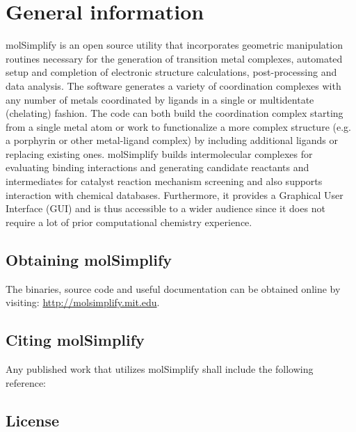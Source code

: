 \section{General information}

molSimplify is an open source utility that incorporates geometric manipulation routines necessary for the generation of transition metal complexes, automated setup and completion of electronic structure calculations, post-processing and data analysis. The software generates a variety of coordination complexes with any number of metals coordinated by ligands in a single or multidentate (chelating) fashion. The code can both build the coordination complex starting from a single metal atom or work to functionalize a more complex structure (e.g. a porphyrin or other metal-ligand complex) by including additional ligands or replacing existing ones. molSimplify builds intermolecular complexes for evaluating binding interactions and generating candidate reactants and intermediates for catalyst reaction mechanism screening and also supports interaction with chemical databases. Furthermore, it provides a Graphical User Interface (GUI) and is thus accessible to a wider audience since it does not require a lot of prior computational chemistry experience.

\subsection{Obtaining molSimplify}
The binaries, source code and useful documentation can be obtained online by visiting: \url{http://molsimplify.mit.edu}. 


\subsection{Citing molSimplify}

Any published work that utilizes molSimplify shall include the following reference:\\ 

\newpage{}
\subsection{License}
